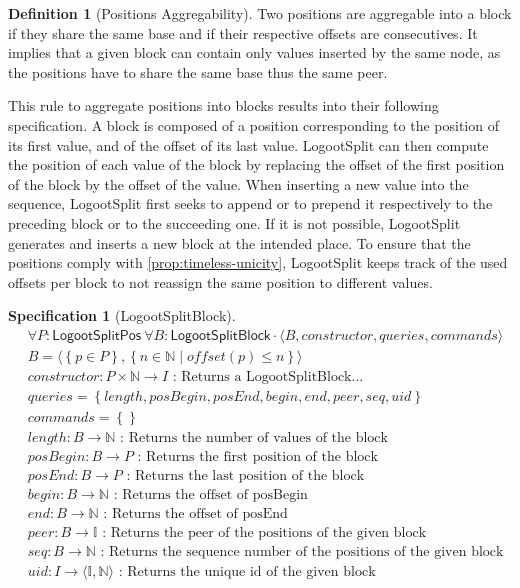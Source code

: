 \documentclass{article}
\newcommand{\commands}[1]{commands = \set{#1}}
\newcommand{\fnspec}[3]{#1: #2 \text{ : #3}}
\newcommand{\inbb}[1]{\in \mathbb{#1}}
\newcommand{\queries}[1]{queries = \set{#1}}
\newcommand{\set}[1]{\left\{#1\right\}} %
\newcommand{\spectuple}[1]{\tuple{#1, constructor, queries, commands}}
\newcommand{\ssep}{\mid} %
\newcommand{\tuple}[1]{\langle #1 \rangle}
\newcounter{definition-counter}
\theoremstyle{definition}
\newtheorem{definition}[definition-counter]{Definition}
\newcounter{note-counter}
\theoremstyle{definition}
\theoremstyle{definition}
\newcounter{specificationcounter}
\theoremstyle{definition}
\newtheorem{specification}[specificationcounter]{Specification}
\begin{document}
\begin{definition}[Positions Aggregability]
    Two positions are aggregable into a block if they share the same base and if their respective offsets are consecutives.
    It implies that a given block can contain only values inserted by the same node, as the positions have to share the same base thus the same peer.
\end{definition}


This rule to aggregate positions into blocks results into their following specification.
A block is composed of a position corresponding to the position of its first value, and of the offset of its last value.
LogootSplit can then compute the position of each value of the block by replacing the offset of the first position of the block by the offset of the value.
When inserting a new value into the sequence, LogootSplit first seeks to append or to prepend it respectively to the preceding block or to the succeeding one.
If it is not possible, LogootSplit generates and inserts a new block at the intended place.
To ensure that the positions comply with \autoref{prop:timeless-unicity}, LogootSplit keeps track of the used offsets per block to not reassign the same position to different values.

\begin{specification}[LogootSplitBlock]
    \begin{align*}
    &\forall P: \mathsf{LogootSplitPos} \ \forall B: \mathsf{LogootSplitBlock} \cdot \spectuple{B}\\
    &B = \tuple{\set{p \in P}, \set{n \inbb{N} \ssep offset(p) \leq n}}\\
    &\fnspec{constructor}{P \times \mathbb{N} \to I}{Returns a LogootSplitBlock...}\\
    &\queries{length, posBegin, posEnd, begin, end, peer, seq, uid}\\
    &\commands{}\\
    &\fnspec{length}{B \to \mathbb{N}}{Returns the number of values of the block}\\
    &\fnspec{posBegin}{B \to P}{Returns the first position of the block}\\
    &\fnspec{posEnd}{B \to P}{Returns the last position of the block}\\
    &\fnspec{begin}{B \to \mathbb{N}}{Returns the offset of posBegin}\\
    &\fnspec{end}{B \to \mathbb{N}}{Returns the offset of posEnd}\\
    &\fnspec{peer}{B \to \mathbb{I}}{Returns the peer of the positions of the given block}\\
    &\fnspec{seq}{B \to \mathbb{N}}{Returns the sequence number of the positions of the given block}\\
    &\fnspec{uid}{I \to \tuple{\mathbb{I}, \mathbb{N}}}{Returns the unique id of the given block}
    \end{align*}
    \label{spec:logootsplit-block}
\end{specification}
\end{document}
